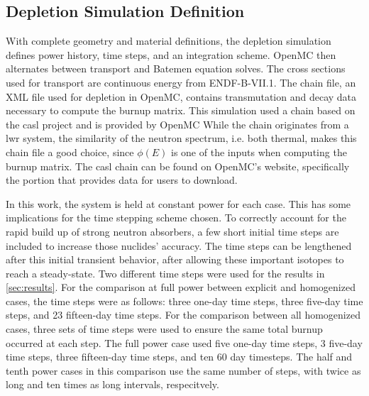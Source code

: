 \documentclass[letterpaper]{physor2024}
\begin{document}
\subsection{Depletion Simulation Definition}\label{sec:depl_sim}
With complete geometry and material definitions, the depletion simulation defines power history, time steps, and an integration scheme. OpenMC then alternates between transport and Batemen equation solves. The cross sections used for transport are continuous energy from ENDF-B-VII.1. The chain file, an XML file used for depletion in OpenMC, contains transmutation and decay data necessary to compute the burnup matrix. This simulation used a chain based on the \gls{casl} project \cite{CASL-report} and is provided by OpenMC \cite{openmc-chains}  While the chain originates from a \gls{lwr} system, the similarity of the neutron spectrum, i.e. both thermal, makes this chain file a good choice, since $\phi(E)$ is one of the inputs when computing the burnup matrix. The \gls{casl} chain can be found on OpenMC's website, specifically the portion that provides data for users to download.

In this work, the system is held at constant power for each case. This has some implications for the time stepping scheme chosen. To correctly account for the rapid build up of strong neutron absorbers, a few short initial time steps are included to increase those nuclides' accuracy. The time steps can be lengthened after this initial transient behavior, after allowing these important isotopes to reach a steady-state. Two different time steps were used for the results in \cref{sec:results}. For the comparison at full power between explicit and homogenized cases, the time steps were as follows: three one-day time steps, three five-day time steps, and 23 fifteen-day time steps. For the comparison between all homogenized cases, three sets of time steps were used to ensure the same total burnup occurred at each step. The full power case used five one-day time steps, 3 five-day time steps, three fifteen-day time steps, and ten 60 day timesteps. The half and tenth power cases in this comparison use the same number of steps, with twice as long and ten times as long intervals, respecitvely.
\end{document}

